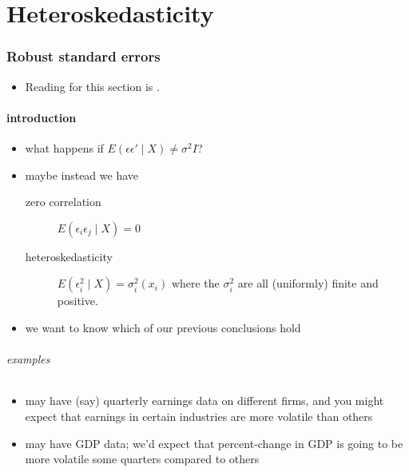 

\part*{Heteroskedasticity}%

\section{Robust standard errors}

\begin{itemize}
\item Reading for this section is \citet[8.1, 8.2, 8.4]{Gre_2011}.
\end{itemize}

\subsection{introduction}

\begin{itemize}
\item what happens if $E(\epsilon \epsilon' \mid X) \neq \sigma^2 I$?
\item maybe instead we have
\begin{description}
\item[zero correlation] $E(\epsilon_i \epsilon_j \mid X) = 0$
\item[heteroskedasticity] $E(\epsilon_i^2 \mid X) =
            \sigma_i^2(x_i)$ where the $\sigma_i^2$ are all
            (uniformly) finite and positive.
\end{description}
\item we want to know which of our previous conclusions hold
\end{itemize}

\paragraph{examples}
\begin{itemize}
\item may have (say) quarterly earnings data on different firms, and
        you might expect that earnings in certain industries are more
        volatile than others
\item may have GDP data; we'd expect that percent-change in GDP is
        going to be more volatile some quarters compared to others
\end{itemize}

